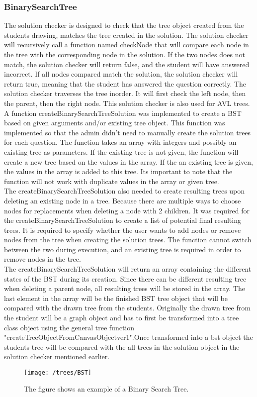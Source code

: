 \subsubsection{BinarySearchTree}
The solution checker is designed to check that the tree object created from the students drawing, matches the tree created in the solution. The solution checker will recursively call a function named checkNode that will compare each node in the tree with the corresponding node in the solution. If the two nodes does not match, the solution checker will return false, and the student will have answered incorrect. If all nodes compared match the solution, the solution checker will return true, meaning that the student has answered the question correctly. The solution checker traverses the tree inorder. It will first check the left node, then the parent, then the right node. This solution checker is also used for AVL trees.
\\[11pt]
A function createBinarySearchTreeSolution was implemented to create a BST based on given arguments and/or existing tree object. This function was implemented so that the admin didn't need to manually create the solution trees for each question. The function takes an array with integers and possibly an existing tree as parameters. If the existing tree is not given, the function will create a new tree based on the values in the array. If the an existing tree is given, the values in the array is added to this tree. Its important to note that the function will not work with duplicate values in the array or given tree.
\\[11pt]
The createBinarySearchTreeSolution also needed to create resulting trees upon deleting an existing node in a tree. Because there are multiple ways to choose nodes for replacements when deleting a node with 2 children. It was required for the createBinarySearchTreeSolution to create a list of potential final resulting trees. It is required to specify whether the user wants to add nodes or remove nodes from the tree when creating the solution trees. The function cannot switch between the two during execution, and an existing tree is required in order to remove nodes in the tree.\cite{BinaryTree}\\[11pt]
The createBinarySearchTreeSolution will return an array containing the different states of the BST during its creation. Since there can be different resulting tree when deleting a parent node, all resulting trees will be stored in the array. The last element in the array will be the finished BST tree object that will be compared with the drawn tree from the students. Originally the drawn tree from the student will be a graph object and has to first be transformed into a tree class object using the general tree function "createTreeObjectFromCanvasObjectver1".Once transformed into a bst object the students tree will be compared with the all trees in the solution object in the solution checker mentioned earlier.
\begin{figure}[H]
	\centering
	\texttt{[image: /trees/BST]}
	\caption{The figure shows an example of a Binary Search Tree.}	
	\label{fig:BST}
\end{figure}
